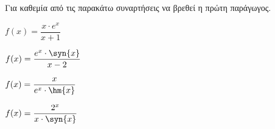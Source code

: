 Για καθεμία από τις παρακάτω συναρτήσεις να βρεθεί η πρώτη παράγωγος.
\begin{multicols}{2}
\begin{alist}
\item $ f(x)=\dfrac{x\cdot e^x}{x+1} $
\item $ f(x)=\dfrac{e^x\cdot\syn{x}}{x-2} $
\item $ f(x)=\dfrac{x}{e^x\cdot\hm{x}} $
\item $ f(x)=\dfrac{2^x}{x\cdot\syn{x}} $
\end{alist}
\end{multicols}
